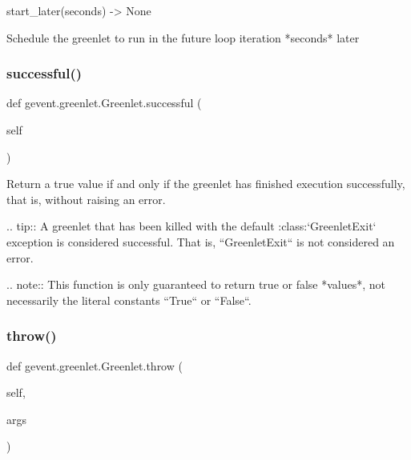 \begin{DoxyVerb}start_later(seconds) -> None

Schedule the greenlet to run in the future loop iteration
*seconds* later
\end{DoxyVerb}
 \mbox{\label{classgevent_1_1greenlet_1_1_greenlet_a8ff843d99c90b7347262884dbc89cbe8}} 
\subsubsection{\texorpdfstring{successful()}{successful()}}
{\footnotesize\ttfamily def gevent.\+greenlet.\+Greenlet.\+successful (\begin{DoxyParamCaption}\item[{}]{self }\end{DoxyParamCaption})}

\begin{DoxyVerb}Return a true value if and only if the greenlet has finished execution
successfully, that is, without raising an error.

.. tip:: A greenlet that has been killed with the default
    :class:`GreenletExit` exception is considered successful.
    That is, ``GreenletExit`` is not considered an error.

.. note:: This function is only guaranteed to return true or false *values*,
      not necessarily the literal constants ``True`` or ``False``.
\end{DoxyVerb}
 \mbox{\label{classgevent_1_1greenlet_1_1_greenlet_ac8e11fe68ed5029c47d2960552f7e155}} 
\subsubsection{\texorpdfstring{throw()}{throw()}}
{\footnotesize\ttfamily def gevent.\+greenlet.\+Greenlet.\+throw (\begin{DoxyParamCaption}\item[{}]{self,  }\item[{}]{args }\end{DoxyParamCaption})}

